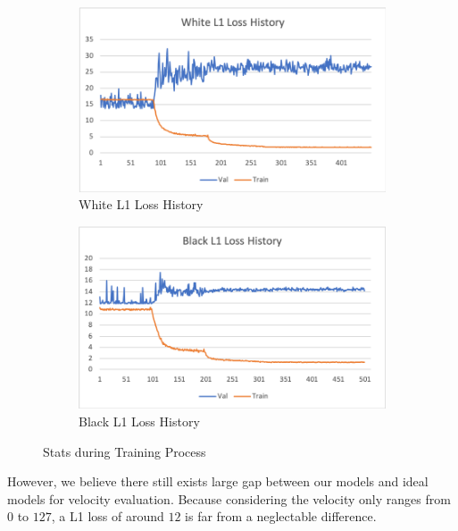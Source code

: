 \documentclass[10pt,twocolumn,letterpaper]{article}
\begin{document}
\begin{figure}[h!]
   \begin{subfigure}{0.5\textwidth}
      \centering
      \includegraphics[width=\linewidth]{fig/vel_1.png}
      \caption{White L1 Loss History} \label{fig:k}
    \end{subfigure}\hspace*{\fill}
    \newline \newline
    \begin{subfigure}{0.5\textwidth}
      \centering
      \includegraphics[width=\linewidth]{fig/vel_3.png}
      \caption{Black L1 Loss History} \label{fig:k}
    \end{subfigure}\hspace*{\fill}
   \caption{Stats during Training Process} \label{fig:6}
\end{figure}   

However, we believe there still exists large gap between our models and ideal models for velocity evaluation. Because considering the velocity only ranges from \(0\) to \(127\), a L1 loss of around \(12\) is far from a neglectable difference.
\end{document}
